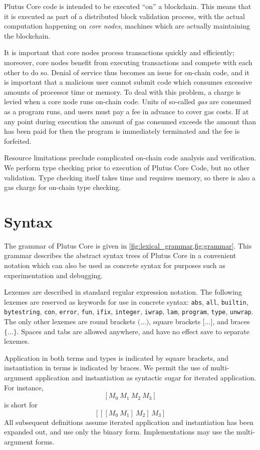\documentclass[a4paper]{article}
\newcommand{\todompj}[1]{\todo[inline,color=yellow!40,author=Michael]{#1}}
\begin{document}
Plutus Core code is intended to be executed ``on'' a blockchain.
This means that it is executed as part of a distributed block validation
process, with the actual computation happening on
\emph{core nodes}, machines which are actually maintaining the
blockchain.

It is important that core nodes process transactions quickly and
efficiently; moreover, core nodes benefit from executing transactions
and compete with each other to do so.  Denial of service thus becomes
an issue for on-chain code, and it is important that a malicious user
cannot submit code which consumes excessive amounts of processor time
or memory. To deal with this problem, a charge is levied when a core
node runs on-chain code.  Units of so-called \emph{gas} are consumed
as a program runs, and users must pay a fee in advance to cover gas
costs.  If at any point during execution the amount of gas consumed
exceeds the amount than has been paid for then the program is
immediately terminated and the fee is forfeited.

Resource limitations preclude complicated on-chain code analysis
and verification.  We perform type checking prior to execution of
Plutus Core Code, but no other validation.  Type checking itself takes
time and requires memory, so there is also a gas charge for on-chain
type checking.


\section{Syntax}

The grammar of Plutus Core is given in
\cref{fig:lexical_grammar,fig:grammar}. This grammar describes the abstract
syntax trees of Plutus Core in a convenient notation which can also be
used as concrete syntax for purposes such as experimentation and
debugging.

Lexemes are described in standard regular expression notation.  The
following lexemes are reserved as keywords for use in concrete syntax:
\texttt{abs}, \texttt{all}, \texttt{builtin}, \texttt{bytestring},
\texttt{con}, \texttt{error}, \texttt{fun}, \texttt{ifix},
\texttt{integer}, \texttt{iwrap}, \texttt{lam}, \texttt{program},
\texttt{type}, \texttt{unwrap}.  The only other lexemes
are round brackets $\texttt{(}\ldots\texttt{)}$, square brackets
$\texttt{[}\ldots\texttt{]}$, and braces
$\texttt{\{}\ldots\texttt{\}}$.  Spaces and tabs are allowed anywhere,
and have no effect save to separate lexemes.

Application in both terms and types is indicated by square
brackets, and instantiation in terms is indicated by braces. We
permit the use of multi-argument application and instantiation as
syntactic sugar for iterated application.
For instance,
\[
  [M_0 ~ M_1 ~ M_2 ~ M_3]
  \]
\noindent is short for
\[
  [[[M_0 ~ M_1] ~ M_2] ~ M_3]
\]
All subsequent definitions assume iterated application and instantiation
has been expanded out, and use only the binary form. Implementations
may use the multi-argument forms.
\todompj{We only use this in the examples, should we drop it?}
\end{document}
